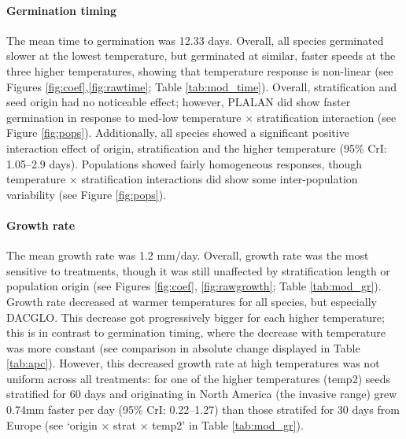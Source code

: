 \documentclass[12pt]{article}\usepackage[]{graphicx}\usepackage[]{color}
\begin{document}
	\paragraph{Germination timing} The mean time to germination was 12.33 days.  Overall, all species germinated slower at the lowest temperature, but germinated at similar, faster speeds at the three higher temperatures, showing that temperature response is non-linear  (see Figures \ref{fig:coef},\ref{fig:rawtime}; Table \ref{tab:mod_time}). Overall, stratification and seed origin had no noticeable effect; however, PLALAN did show faster germination in response to med-low temperature $\times$ stratification interaction (see Figure \ref{fig:pops}).  Additionally, all species showed a significant positive interaction effect of origin, stratification and the higher temperature (95\% CrI: 1.05--2.9 days). 
	Populations showed fairly homogeneous responses, though temperature $\times$ stratification interactions did show some inter-population variability (see Figure \ref{fig:pops}). 
	\paragraph{Growth rate} The mean growth rate was 1.2 mm/day. Overall, growth rate was the most sensitive to treatments, though it was still unaffected by stratification length or population origin (see Figures \ref{fig:coef}, \ref{fig:rawgrowth}; Table \ref{tab:mod_gr}). Growth rate decreased at warmer temperatures for all species, but especially DACGLO. This decrease got progressively bigger for each higher temperature; this is in contrast to germination timing, where the decrease with temperature was more constant (see comparison in absolute change displayed in Table \ref{tab:apc}). 
However, this decreased growth rate at high temperatures was not uniform across all treatments: for one of the higher temperatures (temp2) seeds stratified for 60 days and originating in North America (the invasive range) grew 0.74mm faster per day (95\% CrI: 0.22--1.27) than those stratifed for 30 days from Europe (see `origin $\times$ strat $\times$ temp2' in Table \ref{tab:mod_gr}). 
\end{document}
